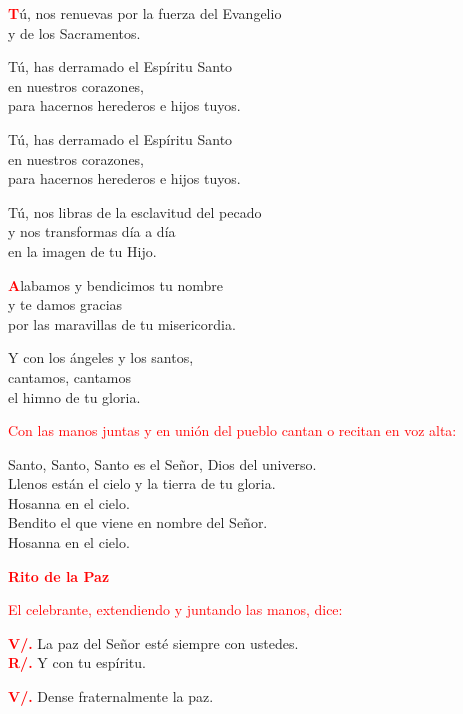 \documentclass[12pt, letterpaper]{report}
\begin{document}
\lettrine[lines=2]{\bfseries \textcolor{red}{T}}{}\Large \'u, nos renuevas por la fuerza del Evangelio\\
y de los Sacramentos.

\noindent
\Large T\'u, has derramado el Esp\'iritu Santo\\
en nuestros corazones,\\
para hacernos herederos e hijos tuyos.

\noindent
\Large T\'u, has derramado el Esp\'iritu Santo\\
en nuestros corazones,\\
para hacernos herederos e hijos tuyos.

\noindent
\Large T\'u, nos libras de la esclavitud del pecado\\
y nos transformas d\'ia a d\'ia\\
en la imagen de tu Hijo.

\lettrine[lines=2]{\bfseries \textcolor{red}{A}}{}\Large labamos y bendicimos tu nombre\\
y te damos gracias\\
por las maravillas de tu misericordia.

\noindent
\Large Y con los \'angeles y los santos,\\
cantamos, cantamos\\
el himno de tu gloria.
    
\large{\textcolor{red}{Con las manos juntas y en uni\'on del pueblo cantan o recitan en voz alta:}}

\noindent
\Large {Santo, Santo, Santo es el Se\~nor, Dios del universo.\\
Llenos est\'an el cielo y la tierra de tu gloria.\\
Hosanna en el cielo.\\
Bendito el que viene en nombre del Se\~nor.\\
Hosanna en el cielo.}

\Large {\bfseries \textcolor{red}{Rito de la Paz}}

\large {\textcolor{red}{El celebrante, extendiendo y juntando las manos, dice:}}

\noindent
\Large {\bfseries \textcolor{red}{V/.}} \hspace{0.5cm} La paz del Se\~nor est\'e siempre con ustedes.\\
\noindent
\Large {\bfseries \textcolor{red}{R/.}} \hspace{0.5cm} Y con tu esp\'iritu. 

\noindent
\Large {\bfseries \textcolor{red}{V/.}} \hspace{0.5cm} Dense fraternalmente la paz. 
\end{document}
